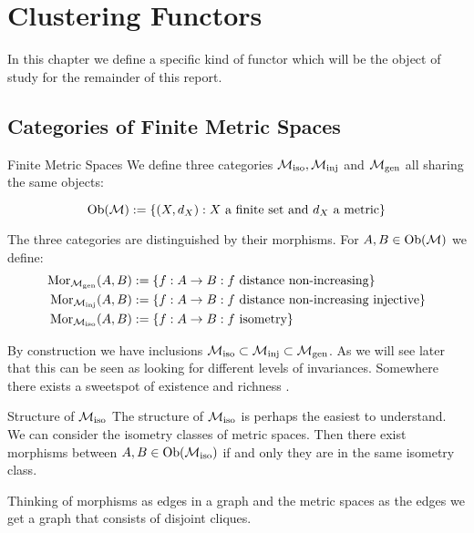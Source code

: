 \chapter{Clustering Functors}


In this chapter we define a specific kind of functor which will be the object of study for the remainder of this report.



\section{Categories of Finite Metric Spaces}

\begin{definition}{Finite Metric Spaces}{}
We define three categories ${\mathcal{M}_\mathrm{iso}}, {\mathcal{M}_\mathrm{inj}}$ and ${\mathcal{M}_\mathrm{gen}}$ all sharing the same objects:

\begin{equation*}
\mathrm {Ob}(\mathcal{M}) := \{(X,d_X): \text{$X$ a finite set and $d_X$ a metric}\}
\end{equation*}

The three categories are distinguished by their morphisms. For $A, B \in \mathrm {Ob}(\mathcal{M})$ we define:
\begin{align*}
\mathrm {Mor}_{\mathcal{M}_\mathrm{gen}}(A,B) &:= \{f: A \to B: \text{$f$ distance non-increasing}\} \\
\mathrm {Mor}_{\mathcal{M}_\mathrm{inj}}(A,B) &:= \{f: A \to B: \text{$f$ distance non-increasing injective}\} \\
\mathrm {Mor}_{\mathcal{M}_\mathrm{iso}}(A,B) &:= \{f: A \to B: \text{$f$ isometry}\} \\
\end{align*}

\end{definition}


By construction we have inclusions ${\mathcal{M}_\mathrm{iso}} \subset {\mathcal{M}_\mathrm{inj}} \subset {\mathcal{M}_\mathrm{gen}}$. As we will see later that this can be seen as looking for different levels of invariances. Somewhere there exists a sweetspot of existence and richness .


\begin{myremark}{Structure of ${\mathcal{M}_\mathrm{iso}}$}{}
The structure of ${\mathcal{M}_\mathrm{iso}}$ is perhaps the easiest to understand. We can consider the isometry classes of metric spaces. Then there exist morphisms between $A, B \in \mathrm {Ob}({\mathcal{M}_\mathrm{iso}})$ if and only they are in the same isometry class.

Thinking of morphisms as edges in a graph and the metric spaces as the edges we get a graph that consists of disjoint cliques.

\end{myremark}

